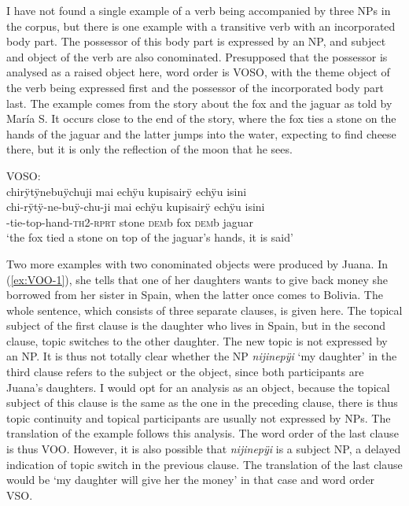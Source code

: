 

I have not found a single example of a  verb being accompanied by three NPs in the corpus, but there is one example with a transitive verb with an incorporated body part. The possessor of this body part is expressed by an NP, and subject and object of the verb are also conominated. Presupposed that the possessor is analysed as a raised object here, word order is VOSO, with the theme object of the verb being expressed first and the possessor of the incorporated body part last. The example comes from the story about the fox and the jaguar as told by María S. It occurs close to the end of the story, where the fox ties a stone on the hands of the jaguar and the latter jumps into the water, expecting to find cheese there, but it is only the reflection of the moon that he sees.


\ea\label{ex:VOSO}
\begingl
\glpreamble \textup{VOSO:}\\chirÿtÿnebuÿchuji mai echÿu kupisairÿ echÿu isini\\
\gla chi-rÿtÿ-ne-buÿ-chu-ji mai echÿu kupisairÿ echÿu isini\\
-tie-top-hand-\textsc{th}2-\textsc{rprt} stone \textsc{dem}b fox \textsc{dem}b jaguar\\
\glft ‘the fox tied a stone on top of the jaguar’s hands, it is said’
\endgl
\trailingcitation{[rxx-n120511l-1.037]}
\xe
 
Two more examples with two conominated objects were produced by Juana. In (\ref{ex:VOO-1}), she tells that one of her daughters wants to give back money she borrowed from her sister in Spain, when the latter once comes to Bolivia. The whole sentence, which consists of three separate clauses, is given here. The topical subject of the first clause is the daughter who lives in Spain, but in the second clause, topic switches to the other daughter. The new topic is not expressed by an NP. It is thus not totally clear whether the NP \textit{nijinepÿi} ‘my daughter’ in the third clause refers to the subject or the object, since both participants are Juana’s daughters. I would opt for an analysis as an object, because the topical subject of this clause is the same as the one in the preceding clause, there is thus topic continuity and topical participants are usually not expressed by NPs. The translation of the example follows this analysis. The word order of the last clause is thus VOO. However, it is also possible that \textit{nijinepÿi} is a subject NP, a delayed indication of topic switch in the previous clause. The translation of the last clause would be ‘my daughter will give her the money’ in that case and word order VSO.

